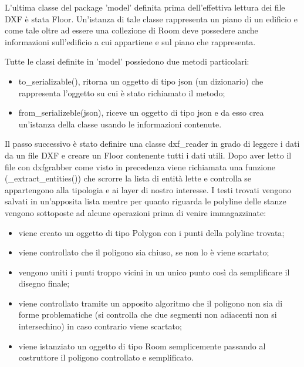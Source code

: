 \documentclass[12pt]{report}
\begin{document}
L'ultima classe del package 'model' definita prima dell'effettiva lettura dei file DXF è stata Floor. Un'istanza di tale classe rappresenta un piano di un edificio e come tale oltre ad essere una collezione di Room deve possedere anche informazioni sull'edificio a cui appartiene e sul piano che rappresenta.

Tutte le classi definite in 'model' possiedono due metodi particolari:
\begin{itemize}
\item to\_serializable(), ritorna un oggetto di tipo json (un dizionario) che rappresenta l'oggetto su cui è stato richiamato il metodo;
\item from\_serializeble(json), riceve un oggetto di tipo json e da esso crea un'istanza della classe usando le informazioni contenute.
\end{itemize}

\vspace{5mm} %

Il passo successivo è stato definire una classe dxf\_reader in grado di leggere i dati da un file DXF e creare un Floor contenente tutti i dati utili.
Dopo aver letto il file con dxfgrabber come visto in precedenza viene richiamata una funzione (\_extract\_entities()) che scrorre la lista di entità lette e controlla se appartengono alla tipologia e ai layer di nostro interesse.
I testi trovati vengono salvati in un'apposita lista mentre per quanto riguarda le polyline delle stanze vengono sottoposte ad alcune operazioni prima di venire immagazzinate:
\begin{itemize}
\item viene creato un oggetto di tipo Polygon con i punti della polyline trovata;
\item viene controllato che il poligono sia chiuso, se non lo è viene scartato;
\item vengono uniti i punti troppo vicini in un unico punto così da semplificare il disegno finale;
\item viene controllato tramite un apposito algoritmo che il poligono non sia di forme problematiche (si controlla che due segmenti non adiacenti non si intersechino) in caso contrario viene scartato;
\item viene istanziato un oggetto di tipo Room semplicemente passando al costruttore il poligono controllato e semplificato.
\end{itemize}
\end{document}
